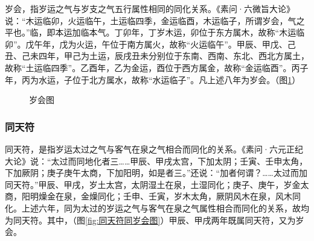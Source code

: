\documentclass[12pt]{ctexbook}
\begin{document}
岁会，指岁运之气与岁支之气五行属性相同的同化关系。《素问·六微旨大论》说：“木运临卯，火运临午，土运临四季，金运临酉，木运临子，所谓岁会，气之平也。”临，即本运加临本气。丁卯年，丁岁木运，卯位于东方属木，故称“木运临卯”。戊午年，戊为火运，午位于南方属火，故称“火运临午”。甲辰、甲戊、己丑、己未四年，甲己为土运，辰戌丑未分别位于东南、西南、东北、西北方属土，故称“土运临四季”。乙酉年，乙为金运，酉位于西方属金，故称“金运临酉”。丙子年，丙为水运，子位于北方属水，故称“水运临子”。凡上述八年为岁会。（图\ref{fig:岁会图}）
\begin{figure}[htb]%
	\centering
	\caption{岁会图}\label{fig:岁会图}
\end{figure}

\subsubsection{同天符}%

同天符，是指岁运太过之气与客气在泉之气相合而同化的关系。《素问·六元正纪大论》说：“太过而同地化者三……甲辰、甲戌太宫，下加太阴；壬寅、壬申太角，下加厥阴；庚子庚午太商，下加阳明，如是者三。”还说：“加者何谓？……太过而加同天符。”甲辰、甲戌，岁土太宫，太阴湿土在泉，土湿同化；庚子、庚午，岁金太商，阳明燥金在泉，金燥同化；壬申、壬寅，岁木太角，厥阴风木在泉，风木同化。上述六年，同为太过的岁运之气与客气在泉之气属性相合而同化的关系，故均为同天符。其中，（图\ref{fig:同天符同岁会图}）甲辰、甲戌两年既属同天符，又为岁会。
\end{document}
